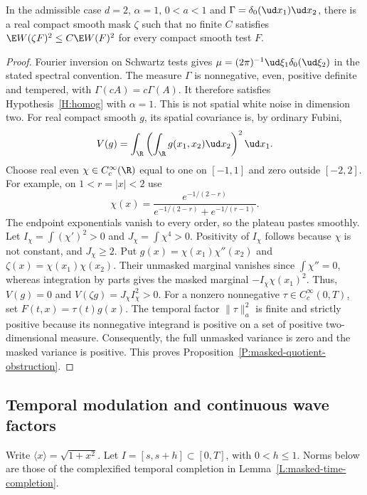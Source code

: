 \begin{proposition}
  \label{P:masked-quotient-obstruction}
  In the admissible case $d = 2$, $\alpha = 1$, $0 < a < 1$ and
  $\Gamma = \delta_0(\ud x_1)\ud x_2$, there is a real compact smooth
  mask $\zeta$ such that no finite $C$ satisfies
  $\E W(\zeta F)^2 \le C\E W(F)^2$ for every compact smooth test $F$.
\end{proposition}

\begin{proof}
  Fourier inversion on Schwartz tests gives
  $\mu = (2\pi)^{-1}\ud\xi_1\delta_0(\ud\xi_2)$ in the stated spectral
  convention. The measure $\Gamma$ is nonnegative, even, positive definite
  and tempered, with $\Gamma(cA) = c\Gamma(A)$. It therefore satisfies
  Hypothesis~\ref{H:homog} with $\alpha = 1$. This is not spatial white
  noise in dimension two. For real compact smooth $g$, its spatial
  covariance is, by ordinary Fubini,
  \[
    V(g) = \int_\R\left(\int_\R g(x_1,x_2)\ud x_2\right)^2\ud x_1.
  \]
  Choose real even $\chi \in C_c^\infty(\R)$ equal to one on $[-1,1]$
  and zero outside $[-2,2]$. For example, on $1 < r = |x| < 2$ use
  \[
    \chi(x) = \frac{e^{-1/(2-r)}}{e^{-1/(2-r)}+e^{-1/(r-1)}}.
  \]
  The endpoint exponentials vanish to every order, so the plateau pastes
  smoothly. Let $I_\chi = \int(\chi')^2 > 0$ and
  $J_\chi = \int\chi^4 > 0$. Positivity of $I_\chi$ follows because
  $\chi$ is not constant, and $J_\chi \ge 2$. Put
  $g(x) = \chi(x_1)\chi''(x_2)$ and
  $\zeta(x) = \chi(x_1)\chi(x_2)$. Their unmasked marginal vanishes since
  $\int\chi'' = 0$, whereas integration by parts gives the masked marginal
  $-I_\chi\chi(x_1)^2$. Thus,
  $V(g) = 0$ and $V(\zeta g) = J_\chi I_\chi^2 > 0$.
  For a nonzero nonnegative $\tau \in C_c^\infty(0,T)$, set
  $F(t,x) = \tau(t)g(x)$. The temporal factor $\|\tau\|_a^2$ is finite
  and strictly positive because its nonnegative integrand is positive on
  a set of positive two-dimensional measure. Consequently, the full
  unmasked variance is zero and the masked variance is positive.
  This proves Proposition~\ref{P:masked-quotient-obstruction}.
\end{proof}

\subsection{Temporal modulation and continuous wave factors}

Write $\langle x\rangle = \sqrt{1+x^2}$. Let
$I = [s,s+h] \subset [0,T]$, with $0 < h \le 1$. Norms below are those of
the complexified temporal completion in Lemma~\ref{L:masked-time-completion}.

